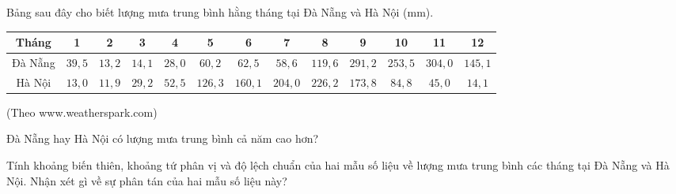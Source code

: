 \begin{bt}%
	Bảng sau đây cho biết lượng mưa trung bình hằng tháng tại Đà Nẵng và Hà Nội (mm).
	\begin{center}
		\begin{tabular}{|c|c|c|c|c|c|c|c|c|c|c|c|c|}
			\hline Tháng & 1 & 2 & 3 & 4 & 5 & 6 & 7 & 8 & 9 & 10 & 11 & 12 \\
			\hline Đà Nẵng & $39{,}5$ & $13{,}2$ & $14{,}1$ & $28{,}0$ & $60{,}2$ & $62{,}5$ & $58{,}6$ & $119{,}6$ & $291{,}2$ & $253{,}5$ & $304{,}0$ & $145{,}1$ \\
			\hline Hà Nội & $13{,}0$ & $11{,}9$ & $29{,}2$ & $52{,}5$ & $126{,}3$ & $160{,}1$ & $204{,}0$ & $226{,}2$ & $173{,}8$ & $84{,}8$ & $45{,}0$ & $14{,}1$ \\
			\hline
		\end{tabular}
		(Theo www.weatherspark.com)
	\end{center}
	\begin{listEX}[1]
		\item Đà Nẵng hay Hà Nội có lượng mưa trung bình cả năm cao hơn?
		\item Tính khoảng biến thiên, khoảng tứ phân vị và độ lệch chuẩn của hai mẫu số liệu về lượng mưa trung bình các tháng tại Đà Nẵng và Hà Nội. Nhận xét gì về sự phân tán của hai mẫu số liệu này?
	\end{listEX}
\end{bt}

